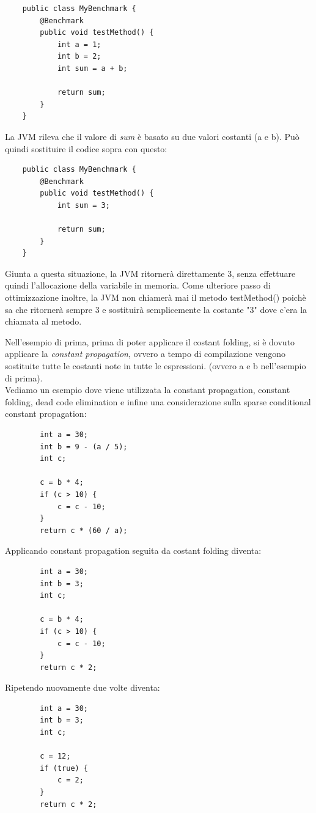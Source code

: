\documentclass[a4paper, 11pt,            %
openright,               %
italian,
english                 
]{article}       %
\begin{document}
	\begin{lstlisting}
	public class MyBenchmark {
		@Benchmark
		public void testMethod() {
			int a = 1;
			int b = 2;
			int sum = a + b;
			
			return sum;
		}
	}
	\end{lstlisting}
	
	La JVM rileva che il valore di \textit{sum} è basato su due valori costanti (a e b). Può quindi sostituire il codice sopra con questo:
	
	\begin{lstlisting}
	public class MyBenchmark {
		@Benchmark
		public void testMethod() {
			int sum = 3;
			
			return sum;
		}
	}
	\end{lstlisting}
	
	Giunta a questa situazione, la JVM ritornerà direttamente 3, senza effettuare quindi l'allocazione della variabile in memoria.
	Come ulteriore passo di ottimizzazione inoltre, la JVM non chiamerà mai il metodo testMethod() poichè sa che ritornerà sempre 3 e sostituirà semplicemente la costante "3" dove c'era la chiamata al metodo.
	
	Nell'esempio di prima, prima di poter applicare il costant folding, si è dovuto applicare la \textit{constant propagation}, ovvero a tempo di compilazione vengono sostituite tutte le costanti note in tutte le espressioni. (ovvero a e b nell'esempio di prima).\\
	Vediamo un esempio dove viene utilizzata la constant propagation, constant folding, dead code elimination e infine una considerazione sulla sparse conditional constant propagation:
	
	\begin{lstlisting}
		int a = 30;
		int b = 9 - (a / 5);
		int c;
		
		c = b * 4;
		if (c > 10) {
			c = c - 10;
		}
		return c * (60 / a);
	\end{lstlisting}
	
	Applicando constant propagation seguita da costant folding diventa:
	
	\begin{lstlisting}
		int a = 30;
		int b = 3;
		int c;
		
		c = b * 4;
		if (c > 10) {
			c = c - 10;
		}
		return c * 2;
	\end{lstlisting}
	
	Ripetendo nuovamente due volte diventa:
	
	\begin{lstlisting}
		int a = 30;
		int b = 3;
		int c;
		
		c = 12;
		if (true) {
			c = 2;
		}
		return c * 2;
	\end{lstlisting}
	
\end{document}
